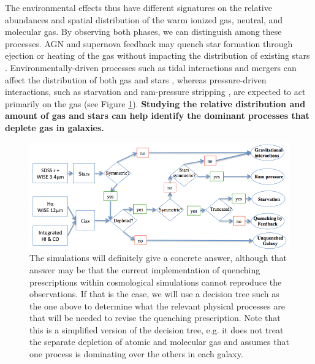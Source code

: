 \documentclass[11pt, preprint]{aastex}
\begin{document}
{The environmental effects thus
have different signatures on the relative abundances and spatial
distribution of the warm ionized gas, neutral, and molecular gas.  By
observing both 
phases, we can distinguish among these processes.}
AGN and supernova feedback may quench star formation through
ejection or heating of the gas without impacting the distribution of
existing stars \citep[e.g.][]{springel05,
  croton06, dekel06}.  Environmentally-driven processes 
such as tidal interactions and
mergers can
affect the distribution of both gas and stars \citep{springel05,
  croton06, dekel06}, whereas pressure-driven interactions, such as
starvation \citep{Larson80} and ram-pressure stripping
\citep[e.g.][]{Gunn72}, are expected to
act primarily on the gas (see Figure \ref{decisiontree}).  
{\bf Studying the relative distribution
and amount of gas and stars can help identify the dominant processes
that deplete gas in galaxies. }
 
\begin{figure}[h]
   \centering
\includegraphics[width=.9\textwidth]{decision_tree.png}
   \caption{\small The simulations will definitely give a concrete answer, although that answer may be that the current implementation of quenching prescriptions within cosmological simulations cannot reproduce the observations.  If that is the case, we will use a decision tree such as the one above to determine what the relevant physical processes are that will be needed to revise the quenching prescription.  Note that this is a simplified version of the decision tree, e.g. it does not treat the separate depletion of atomic and molecular gas and assumes that one process is dominating over the others in each galaxy.}
     \label{decisiontree}
 \end{figure}
\end{document}
